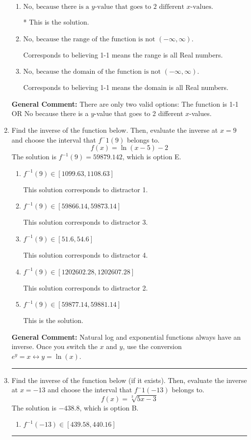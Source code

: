 \documentclass{extbook}[14pt]
\newcommand{\litem}[1]{\item #1

\rule{\textwidth}{0.4pt}}
\begin{document}
\begin{enumerate}
{\begin{enumerate}[label=\Alph*.]
Corresponds to the Vertical Line test, which checks if an expression is a function.
\item \( \text{No, because there is a $y$-value that goes to 2 different $x$-values.} \)

* This is the solution.
\item \( \text{No, because the range of the function is not $(-\infty, \infty)$.} \)

Corresponds to believing 1-1 means the range is all Real numbers.
\item \( \text{No, because the domain of the function is not $(-\infty, \infty)$.} \)

Corresponds to believing 1-1 means the domain is all Real numbers.
\end{enumerate}

\textbf{General Comment:} There are only two valid options: The function is 1-1 OR No because there is a $y$-value that goes to 2 different $x$-values.
}
\litem{
Find the inverse of the function below. Then, evaluate the inverse at $x = 9$ and choose the interval that $f^-1(9)$ belongs to.
\[ f(x) = \ln{(x-5)}-2 \]The solution is \( f^{-1}(9) = 59879.142 \), which is option E.\begin{enumerate}[label=\Alph*.]
\item \( f^{-1}(9) \in [1099.63, 1108.63] \)

 This solution corresponds to distractor 1.
\item \( f^{-1}(9) \in [59866.14, 59873.14] \)

 This solution corresponds to distractor 3.
\item \( f^{-1}(9) \in [51.6, 54.6] \)

 This solution corresponds to distractor 4.
\item \( f^{-1}(9) \in [1202602.28, 1202607.28] \)

 This solution corresponds to distractor 2.
\item \( f^{-1}(9) \in [59877.14, 59881.14] \)

 This is the solution.
\end{enumerate}

\textbf{General Comment:} Natural log and exponential functions always have an inverse. Once you switch the $x$ and $y$, use the conversion $ e^y = x \leftrightarrow y=\ln(x)$.
}
\litem{
Find the inverse of the function below (if it exists). Then, evaluate the inverse at $x = -13$ and choose the interval that $f^-1(-13)$ belongs to.
\[ f(x) = \sqrt[3]{5 x - 3} \]The solution is \( -438.8 \), which is option B.\begin{enumerate}[label=\Alph*.]
\item \( f^{-1}(-13) \in [439.58, 440.16] \)


\end{enumerate}}
\end{enumerate}
\end{document}
